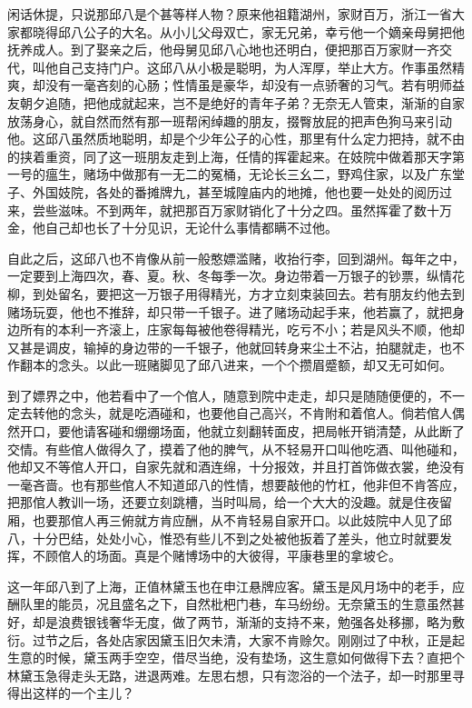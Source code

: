 \documentclass[12pt,UTF8]{ctexbook}
\begin{document}
{{{闲话休提，只说那邱八是个甚等样人物？原来他祖籍湖州，家财百万，浙江一省大家都晓得邱八公子的大名。从小儿父母双亡，家无兄弟，幸亏他一个嫡亲母舅把他抚养成人。到了娶亲之后，他母舅见邱八心地也还明白，便把那百万家财一齐交代，叫他自己支持门户。这邱八从小极是聪明，为人浑厚，举止大方。作事虽然精爽，却没有一毫吝刻的心肠；性情虽是豪华，却没有一点骄奢的习气。若有明师益友朝夕追随，把他成就起来，岂不是绝好的青年子弟？无奈无人管束，渐渐的自家放荡身心，就自然而然有那一班帮闲绰趣的朋友，掇臀放屁的把声色狗马来引动他。这邱八虽然质地聪明，却是个少年公子的心性，那里有什么定力把持，就不由的挟着重资，同了这一班朋友走到上海，任情的挥霍起来。在妓院中做着那天字第一号的瘟生，赌场中做那有一无二的冤桶，无论长三幺二，野鸡住家，以及广东堂子、外国妓院，各处的番摊牌九，甚至城隍庙内的地摊，他也要一处处的阅历过来，尝些滋味。不到两年，就把那百万家财销化了十分之四。虽然挥霍了数十万金，他自己却也长了十分见识，无论什么事情都瞒不过他。

自此之后，这邱八也不肯像从前一般憨嫖滥赌，收抬行李，回到湖州。每年之中，一定要到上海四次，春、夏。秋、冬每季一次。身边带着一万银子的钞票，纵情花柳，到处留名，要把这一万银子用得精光，方才立刻束装回去。若有朋友约他去到赌场玩耍，他也不推辞，却只带一千银子。进了赌场动起手来，他若赢了，就把身边所有的本利一齐滚上，庄家每每被他卷得精光，吃亏不小；若是风头不顺，他却又甚是调皮，输掉的身边带的一千银子，他就回转身来尘土不沾，拍腿就走，也不作翻本的念头。以此一班赌脚见了邱八进来，一个个攒眉蹙额，却又无可如何。

到了嫖界之中，他若看中了一个倌人，随意到院中走走，却只是随随便便的，不一定去转他的念头，就是吃酒碰和，也要他自己高兴，不肯附和着倌人。倘若倌人偶然开口，要他请客碰和绷绷场面，他就立刻翻转面皮，把局帐开销清楚，从此断了交情。有些倌人做得久了，摸着了他的脾气，从不轻易开口叫他吃酒、叫他碰和，他却又不等倌人开口，自家先就和酒连绵，十分报效，并且打首饰做衣裳，绝没有一毫吝啬。也有那些倌人不知道邱八的性情，想要敲他的竹杠，他非但不肯答应，把那倌人教训一场，还要立刻跳槽，当时叫局，给一个大大的没趣。就是住夜留厢，也要那倌人再三俯就方肯应酬，从不肯轻易自家开口。以此妓院中人见了邱八，十分巴结，处处小心，惟恐有些儿不到之处被他扳着了差头，他立时就要发挥，不顾倌人的场面。真是个赌博场中的大彼得，平康巷里的拿坡仑。

这一年邱八到了上海，正值林黛玉也在申江悬牌应客。黛玉是风月场中的老手，应酬队里的能员，况且盛名之下，自然枇杷门巷，车马纷纷。无奈黛玉的生意虽然甚好，却是浪费银钱奢华无度，做了两节，渐渐的支持不来，勉强各处移挪，略为敷衍。过节之后，各处店家因黛玉旧欠未清，大家不肯赊欠。刚刚过了中秋，正是起生意的时候，黛玉两手空空，借尽当绝，没有垫场，这生意如何做得下去？直把个林黛玉急得走头无路，进退两难。左思右想，只有淴浴的一个法子，却一时那里寻得出这样的一个主儿？

}}}
\end{document}
